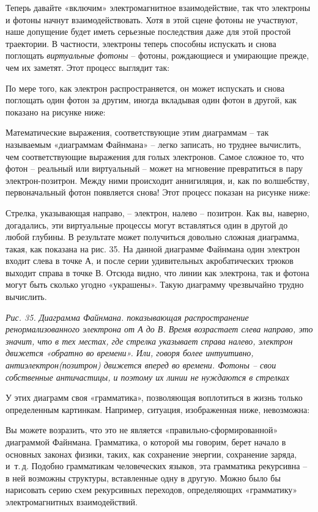 \documentclass[../main.tex]{subfiles}
\begin{document}
Теперь давайте «включим» электромагнитное взаимодействие, так что электроны и фотоны начнут взаимодействовать. Хотя в этой сцене фотоны не участвуют, наше допущение будет иметь серьезные последствия даже для этой простой траектории. В частности, электроны теперь способны испускать и снова поглощать \emph{виртуальные фотоны} \--- фотоны, рождающиеся и умирающие прежде, чем их заметят. Этот процесс выглядит так:

По мере того, как электрон распространяется, он может испускать и снова поглощать один фотон за другим, иногда вкладывая один фотон в другой, как показано на рисунке ниже:

Математические выражения, соответствующие этим диаграммам \--- так называемым «диаграммам Файнмана» \--- легко записать, но труднее вычислить, чем соответствующие выражения для голых электронов. Самое сложное то, что фотон \--- реальный или виртуальный \--- может на мгновение превратиться в пару электрон-позитрон. Между ними происходит аннигиляция, и, как по волшебству, первоначальный фотон появляется снова! Этот процесс показан на рисунке ниже:

Стрелка, указывающая направо, \--- электрон, налево \--- позитрон. Как вы, наверно, догадались, эти виртуальные процессы могут вставляться один в другой до любой глубины. В результате может получиться довольно сложная диаграмма, такая, как показана на рис. 35. На данной диаграмме Файнмана один электрон входит слева в точке А, и после серии удивительных акробатических трюков выходит справа в точке В. Отсюда видно, что линии как электрона, так и фотона могут быть сколько угодно «украшены». Такую диаграмму чрезвычайно трудно вычислить.

\emph{Рис. 35. Диаграмма Файнмана. показывающая распространение ренормализованного электрона от А до В. Время возрастает слева направо, это значит, что в тех местах, где стрелка указывает справа налево, электрон движется «обратно во времени». Или, говоря более интуитивно, антиэлектрон(позитрон) движется вперед во времени. Фотоны \--- свои собственные античастицы, и поэтому их линии не нуждаются в стрелках}

У этих диаграмм своя «грамматика», позволяющая воплотиться в жизнь только определенным картинкам. Например, ситуация, изображенная ниже, невозможна:

Вы можете возразить, что это не является «правильно-сформированной» диаграммой Файнмана. Грамматика, о которой мы говорим, берет начало в основных законах физики, таких, как сохранение энергии, сохранение заряда, и~т.\,д. Подобно грамматикам человеческих языков, эта грамматика рекурсивна \--- в ней возможны структуры, вставленные одну в другую. Можно было бы нарисовать серию схем рекурсивных переходов, определяющих «грамматику» электромагнитных взаимодействий.
\end{document}
